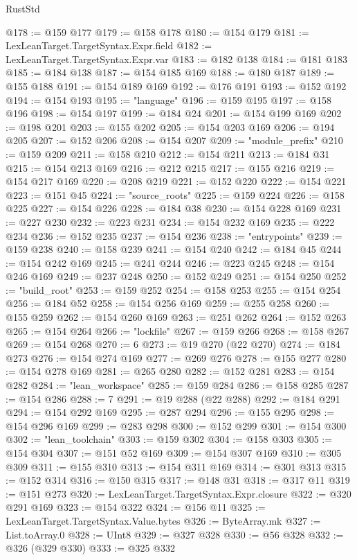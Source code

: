 \begin{lexlean}{RustStd}
\begin{coremodule}
{\begin{coremodule}
{{{{{{{{{{{{{{{{{{{{{{{{{{{{{{{{{{{{{{{{{{{{{{{{{{{{{{{{{{{{{{{{{{{{{{{{{{{{{{{{@178 := @159 @177
@179 := @158 @178
@180 := @154 @179
@181 := LexLeanTarget.TargetSyntax.Expr.field
@182 := LexLeanTarget.TargetSyntax.Expr.var
@183 := @182 @138
@184 := @181 @183
@185 := @184 @138
@187 := @154 @185 @169
@188 := @180 @187
@189 := @155 @188
@191 := @154 @189 @169
@192 := @176 @191
@193 := @152 @192
@194 := @154 @193
@195 := "language"
@196 := @159 @195
@197 := @158 @196
@198 := @154 @197
@199 := @184 @24
@201 := @154 @199 @169
@202 := @198 @201
@203 := @155 @202
@205 := @154 @203 @169
@206 := @194 @205
@207 := @152 @206
@208 := @154 @207
@209 := "module_prefix"
@210 := @159 @209
@211 := @158 @210
@212 := @154 @211
@213 := @184 @31
@215 := @154 @213 @169
@216 := @212 @215
@217 := @155 @216
@219 := @154 @217 @169
@220 := @208 @219
@221 := @152 @220
@222 := @154 @221
@223 := @151 @45
@224 := "source_roots"
@225 := @159 @224
@226 := @158 @225
@227 := @154 @226
@228 := @184 @38
@230 := @154 @228 @169
@231 := @227 @230
@232 := @223 @231
@234 := @154 @232 @169
@235 := @222 @234
@236 := @152 @235
@237 := @154 @236
@238 := "entrypoints"
@239 := @159 @238
@240 := @158 @239
@241 := @154 @240
@242 := @184 @45
@244 := @154 @242 @169
@245 := @241 @244
@246 := @223 @245
@248 := @154 @246 @169
@249 := @237 @248
@250 := @152 @249
@251 := @154 @250
@252 := "build_root"
@253 := @159 @252
@254 := @158 @253
@255 := @154 @254
@256 := @184 @52
@258 := @154 @256 @169
@259 := @255 @258
@260 := @155 @259
@262 := @154 @260 @169
@263 := @251 @262
@264 := @152 @263
@265 := @154 @264
@266 := "lockfile"
@267 := @159 @266
@268 := @158 @267
@269 := @154 @268
@270 := 6
@273 := @19 @270 (@22 @270)
@274 := @184 @273
@276 := @154 @274 @169
@277 := @269 @276
@278 := @155 @277
@280 := @154 @278 @169
@281 := @265 @280
@282 := @152 @281
@283 := @154 @282
@284 := "lean_workspace"
@285 := @159 @284
@286 := @158 @285
@287 := @154 @286
@288 := 7
@291 := @19 @288 (@22 @288)
@292 := @184 @291
@294 := @154 @292 @169
@295 := @287 @294
@296 := @155 @295
@298 := @154 @296 @169
@299 := @283 @298
@300 := @152 @299
@301 := @154 @300
@302 := "lean_toolchain"
@303 := @159 @302
@304 := @158 @303
@305 := @154 @304
@307 := @151 @52 @169
@309 := @154 @307 @169
@310 := @305 @309
@311 := @155 @310
@313 := @154 @311 @169
@314 := @301 @313
@315 := @152 @314
@316 := @150 @315
@317 := @148 @31
@318 := @317 @11
@319 := @151 @273
@320 := LexLeanTarget.TargetSyntax.Expr.closure
@322 := @320 @291 @169
@323 := @154 @322
@324 := @156 @11
@325 := LexLeanTarget.TargetSyntax.Value.bytes
@326 := ByteArray.mk
@327 := List.toArray.{0}
@328 := UInt8
@329 := @327 @328
@330 := @56 @328
@332 := @326 (@329 @330)
@333 := @325 @332
}}}}}}}}}}}}}}}}}}}}}}}}}}}}}}}}}}}}}}}}}}}}}}}}}}}}}}}}}}}}}}}}}}}}}}}}}}}}}}}}
\end{coremodule}}
\end{coremodule}
\end{lexlean}
